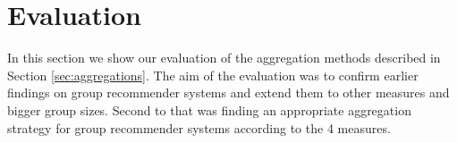 \section{Evaluation}\label{sec:evaluation}
In this section we show our evaluation of the aggregation methods described in Section \ref{sec:aggregations}. The aim of the evaluation was to confirm earlier findings on group recommender systems and extend them to other measures and bigger group sizes. Second to that was finding an appropriate aggregation strategy for group recommender systems according to the 4 measures.


